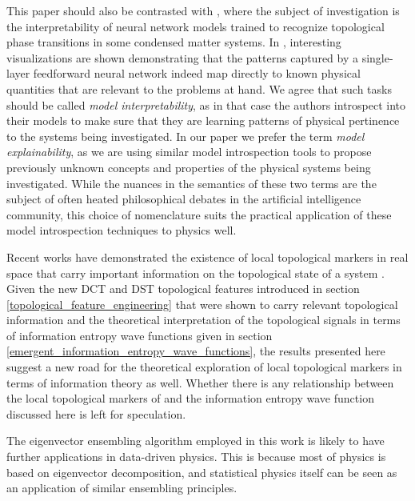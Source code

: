 \documentclass[10pt]{revtex4-1}
\begin{document}
This paper should also be contrasted with \cite{zhang2020interpreting}, where the subject of investigation is the interpretability of neural network models trained to recognize topological phase transitions in some condensed matter systems. In \cite{zhang2020interpreting}, interesting visualizations are shown demonstrating that the patterns captured by a single-layer feedforward neural network indeed map directly to known physical quantities that are relevant to the problems at hand. We agree that such tasks should be called \emph{model interpretability}, as in that case the authors introspect into their models to make sure that they are learning patterns of physical pertinence to the systems being investigated. In our paper we prefer the term \emph{model explainability}, as we are using similar model introspection tools to propose previously unknown concepts and properties of the physical systems being investigated. While the nuances in the semantics of these two terms are the subject of often heated philosophical debates in the artificial intelligence community, this choice of nomenclature suits the practical application of these model introspection techniques to physics well.

Recent works have demonstrated the existence of local topological markers in real space that carry important information on the topological state of a system \cite{PhysRevB.84.241106,caio2019topological}. Given the new DCT and DST topological features introduced in section \ref{topological_feature_engineering} that were shown to carry relevant topological information and the theoretical interpretation of the topological signals in terms of information entropy wave functions given in section \ref{emergent_information_entropy_wave_functions}, the results presented here suggest a new road for the theoretical exploration of local topological markers in terms of information theory as well. Whether there is any relationship between the local topological markers of \cite{PhysRevB.84.241106,caio2019topological} and the information entropy wave function discussed here is left for speculation.
 
The eigenvector ensembling algorithm employed in this work is likely to have further applications in data-driven physics. This is because most of physics is based on eigenvector decomposition, and statistical physics itself can be seen as an application of similar ensembling principles. 
\end{document}
